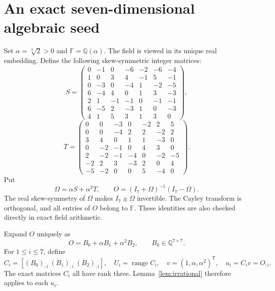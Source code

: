 \documentclass[11pt]{article}
\theoremstyle{definition}
\newcommand{\Q}{\mathbb Q}
\newcommand{\F}{\mathbb F}
\newcommand{\range}{\operatorname{range}}
\newcommand{\trans}{^{\mathsf T}}
\numberwithin{equation}{section}
\begin{document}
\section{An exact seven-dimensional algebraic seed}\label{sec:seed}
Set $\alpha=\sqrt[3]{2}>0$ and $\F=\Q(\alpha)$. The field is viewed in
its unique real embedding. Define the following skew-symmetric integer
matrices:
\begin{equation}\label{eq:S}
 S=\begin{pmatrix}
 0&-1&0&-6&-2&-6&-4\\
 1&0&3&4&-1&5&-1\\
 0&-3&0&-4&1&-2&-5\\
 6&-4&4&0&1&3&-3\\
 2&1&-1&-1&0&-1&-1\\
 6&-5&2&-3&1&0&-3\\
 4&1&5&3&1&3&0
 \end{pmatrix},
\end{equation}
\begin{equation}\label{eq:T}
 T=\begin{pmatrix}
 0&0&-3&0&-2&2&5\\
 0&0&-4&2&2&-2&2\\
 3&4&0&1&1&-3&0\\
 0&-2&-1&0&4&3&0\\
 2&-2&-1&-4&0&-2&-5\\
 -2&2&3&-3&2&0&4\\
 -5&-2&0&0&5&-4&0
 \end{pmatrix}.
\end{equation}
Put
\begin{equation}\label{eq:cayley}
 \Omega=\alpha S+\alpha^2T,\qquad
 O=(I_7+\Omega)^{-1}(I_7-\Omega).
\end{equation}
The real skew-symmetry of $\Omega$ makes $I_7\pm\Omega$ invertible.
The Cayley transform is orthogonal, and all entries of $O$ belong to $\F$.
These identities are also checked directly in exact field arithmetic.

Expand $O$ uniquely as
\begin{equation}\label{eq:coefficientmatrices}
 O=B_0+\alpha B_1+\alpha^2B_2,\qquad B_k\in\Q^{7\times7}.
\end{equation}
For $1\leq i\leq7$, define
\begin{equation}\label{eq:Cis}
 C_i=[(B_0)_{:i}\ (B_1)_{:i}\ (B_2)_{:i}],\quad
 U_i=\range C_i,\quad v=(1,\alpha,\alpha^2)\trans,
 \quad u_i=C_iv=O_{:i}.
\end{equation}
The exact matrices $C_i$ all have rank three. Lemma~\ref{lem:irrational}
therefore applies to each $u_i$.
\end{document}
